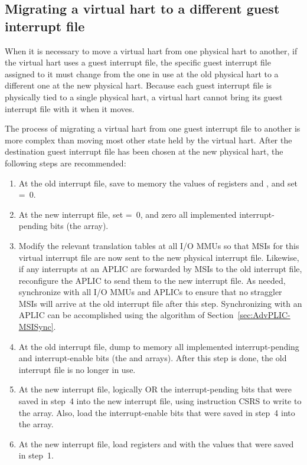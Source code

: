 \subsection{Migrating a virtual hart to a different guest interrupt file}
\label{sec:virtHartMigration}

When it is necessary to move a virtual hart from one physical hart to
another, if the virtual hart uses a guest interrupt file, the specific
guest interrupt file assigned to it must change from the one in use at
the old physical hart to a different one at the new physical hart.
Because each guest interrupt file is physically tied to a single
physical hart, a virtual hart cannot bring its guest interrupt file
with it when it moves.

The process of migrating a virtual hart from one guest interrupt file
to another is more complex than moving most other state held by the
virtual hart.
After the destination guest interrupt file has been chosen at the new
physical hart, the following steps are recommended:
\begin{enumerate}

\item
At the old interrupt file, save to memory the values of registers
 and , and set  =~0.

\item
At the new interrupt file, set  =~0, and zero all
implemented interrupt-pending bits (the  array).

\item
Modify the relevant translation tables at all I/O MMUs so that MSIs for
this virtual interrupt file are now sent to the new physical interrupt
file.
Likewise, if any interrupts at an APLIC are forwarded by MSIs to the old
interrupt file, reconfigure the APLIC to send them to the new interrupt
file.
As needed, synchronize with all I/O MMUs and APLICs to ensure that no
straggler MSIs will arrive at the old interrupt file after this step.
Synchronizing with an APLIC can be accomplished using the
algorithm of Section~\ref{sec:AdvPLIC-MSISync}.

\item
At the old interrupt file, dump to memory all implemented
interrupt-pending and interrupt-enable bits (the  and 
arrays).
After this step is done, the old interrupt file is no longer in use.

\item
At the new interrupt file, logically OR the interrupt-pending bits that
were saved in step~4 into the new interrupt file, using instruction
CSRS to write to the  array.
Also, load the interrupt-enable bits that were saved in step~4 into the
 array.

\item
At the new interrupt file, load registers  and
 with the values that were saved in step~1.

\end{enumerate}

